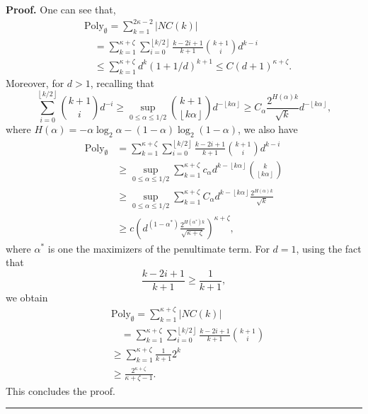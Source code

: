 \documentclass{article}%
\newenvironment{proof}[1][Proof]{\noindent\textbf{#1.} }{\ \rule{0.5em}{0.5em}}
\newcommand{\floor}[1]{\left \lfloor {#1}\right \rfloor}
\begin{document}
\begin{proof}
One can see that, 
\begin{align*}
&\text{Poly}_{\emptyset} = \sum_{k = 1}^{2\kappa - 2} |NC(k)| \\
& \quad = \sum_{k = 1}^{\kappa +\zeta}  \sum_{i = 0}^{\floor{k/2}} \frac{k -2i +1}{k+1} \binom{k+1}{i} d^{k - i}\\
& \quad \leq \sum_{k = 1}^{\kappa + \zeta} d^{k} ( 1 + 1/d)^{k+1} \leq C (d+1)^{\kappa+\zeta}.
\end{align*}
Moreover, for $d > 1$, recalling that
\[
\sum_{i=0}^{\floor{k/2}} \binom{k+1}{i} d^{-i} \geq \sup_{0 \leq \alpha \leq 1/2 }   \binom{k+1}{\floor{k\alpha}} d^{-\floor{k\alpha}} \geq C_\alpha \frac{2^{H(\alpha) k }}{\sqrt{k}} d^{-\floor{k\alpha}},
\]
where $H(\alpha) = -\alpha \log_2\alpha -(1-\alpha)\log_2(1-\alpha)$,
we also have
\begin{align*}
\text{Poly}_{\emptyset} &= \sum_{k = 1}^{\kappa + \zeta}  \sum_{i = 0}^{\floor{k/2}} \frac{k -2i +1}{k+1} \binom{k+1}{i} d^{k - i} \\
&\geq \sup_{0 \leq \alpha \leq 1/2}\sum_{k = 1}^{\kappa + \zeta} c_\alpha d^{k - \floor{k\alpha}} \binom{k}{\floor{k\alpha}} \\
&\geq \sup_{0 \leq \alpha \leq 1/2}\sum_{k = 1}^{\kappa + \zeta} C_\alpha d^{k - \floor{k\alpha}} \frac{2^{H(\alpha)k}}{\sqrt{k}}  \\
& \geq c \left(d^{(1 - \alpha^*)} \frac{2^{H(\alpha^*)k}}{\sqrt{\kappa + \zeta}}\right)^{\kappa + \zeta},
\end{align*}
where $\alpha^*$ is one the maximizers of the penultimate term.\newline
For $d = 1 $, using the fact that \[
\frac{k -2i +1}{k+1}  \geq \frac{1}{k+1}, 
\] we obtain
\begin{align*}
&\text{Poly}_{\emptyset} = \sum_{k = 1}^{\kappa +  \zeta} |NC(k)| \\
& \quad = \sum_{k = 1}^{\kappa + \zeta} \sum_{i = 0}^{\floor{k/2}} \frac{k -2i +1}{k+1} \binom{k+1}{i}\\ 
& \geq \sum_{k = 1}^{\kappa + \zeta}  \frac{1}{k+1} 2^{k} \\
& \geq \frac{2^{\kappa + \zeta}}{\kappa + \zeta -1}.
\end{align*}
This concludes the proof.
\end{proof}
\end{document}
